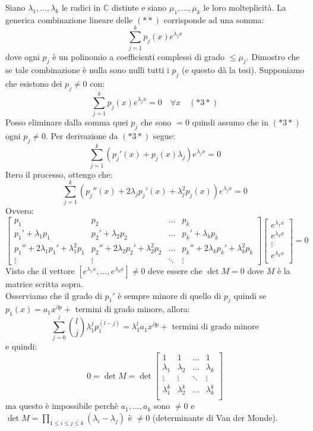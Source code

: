 \documentclass[a4paper,11pt,titlepage]{book}
\begin{document}
Siano $\lambda_1,\ldots,\lambda_k$ le radici in $\mathbb{C}$ distinte e siano $\mu_1,\ldots,\mu_k$ le loro molteplicità. La generica combinazione lineare delle $(**)$ corrisponde ad una somma:
$$\sum_{j=1}^kp_j(x)e^{\lambda_j x}$$
dove ogni $p_j$ è un polinomio a coefficienti complessi di grado $\leq\mu_j$. Dimostro che se tale combinazione è nulla sono nulli tutti i $p_j$ (e questo dà la tesi). Supponiamo che esistono dei $p_j\ne 0$ con:
$$\sum_{j=1}^kp_j(x)e^{\lambda_j x}=0\quad\forall x\quad(*3*)$$
Posso eliminare dalla somma quei $p_j$ che sono $=0$ quindi assumo che in $(*3*)$ ogni $p_j\ne0$. Per derivazione da $(*3*)$ segue:
$$\sum_{j=1}^k(p_j'(x)+p_j(x)\lambda_j)e^{\lambda_j x}=0$$
Itero il processo, ottengo che:
$$\sum_{j=1}^k(p_j''(x)+2\lambda_jp_j'(x)+\lambda_j^2p_j(x))e^{\lambda_j x}=0$$
Ovvero:
$$\begin{bmatrix}
p_1 & p_2 & \ldots & p_k\\
p_1'+\lambda_1p_1 & p_2'+\lambda_2p_2 & \ldots & p_k'+\lambda_kp_k\\
p_1''+2\lambda_1p_1'+\lambda_1^2p_1 & p_2''+2\lambda_2p_2'+\lambda_2^2p_2 & \ldots & p_k''+2\lambda_kp_k'+\lambda_k^2p_k\\
\vdots & \vdots & \ddots & \vdots\end{bmatrix}
\begin{bmatrix}
e^{\lambda_1 x}\\
e^{\lambda_2 x}\\
\vdots\\
e^{\lambda_k x}\\
\end{bmatrix}=0$$
Visto che il vettore $[e^{\lambda_1 x},\ldots,e^{\lambda_k x}]\ne 0$ deve essere che $\det M=0$ dove $M$ è la matrice scritta sopra.\\

Osserviamo che il grado di $p_1'$ è sempre minore di quello di $p_j$ quindi se $p_1(x)=a_1x^{\partial p}+$ termini di grado minore, allora:
$$\sum_{j=0}^l\binom{l}{j}\lambda_1^jp_1^{(l-j)}=\lambda_1^la_1x^{\partial p}+\mbox{ termini di grado minore}$$
e quindi:
$$0=\det M=\det\begin{bmatrix}
1 & 1 & \ldots & 1 \\
\lambda_1 & \lambda_2 &\ldots & \lambda_k\\
\vdots & \vdots & \ddots & \vdots \\
\lambda_1^k & \lambda_2^k &\ldots & \lambda_k^k\\
\end{bmatrix}$$
ma questo è impossibile perchè $a_1,\ldots,a_k$ sono $\ne 0$ e $\det M=\prod\limits_{1\leq i\leq j\leq k}(\lambda_i-\lambda_j)$ è $\ne 0$ (determinante di Van der Monde).\\
\end{document}
